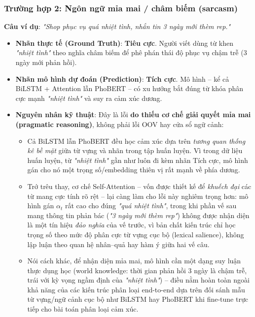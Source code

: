\documentclass[12pt,a4paper]{article}
\begin{document}
\subsubsection{Trường hợp 2: Ngôn ngữ mỉa mai / châm biếm (sarcasm)}\label{sec:error_sarcasm}
\textbf{Câu ví dụ}: \textit{"Shop phục vụ quá nhiệt tình, nhắn tin 3 ngày mới thèm rep."}

\begin{itemize}[leftmargin=1.0cm, itemsep=2pt]
    \item[--] \textbf{Nhãn thực tế (Ground Truth)}: \textbf{Tiêu cực}. Người viết dùng từ khen \textit{"nhiệt tình"} theo nghĩa châm biếm để phê phán thái độ phục vụ chậm trễ (3 ngày mới phản hồi).
    \item[--] \textbf{Nhãn mô hình dự đoán (Prediction)}: \textbf{Tích cực}. Mô hình -- kể cả BiLSTM + Attention lẫn PhoBERT -- có xu hướng bắt đúng từ khóa phân cực mạnh \textit{"nhiệt tình"} và suy ra cảm xúc dương.
    \item[--] \textbf{Nguyên nhân kỹ thuật}: Đây là lỗi \textbf{do thiếu cơ chế giải quyết mỉa mai (pragmatic reasoning)}, không phải lỗi OOV hay cửa sổ ngữ cảnh:
    \begin{itemize}[leftmargin=0.6cm, itemsep=1pt]
        \item Cả BiLSTM lẫn PhoBERT đều học cảm xúc dựa trên \textit{tương quan thống kê bề mặt} giữa từ vựng và nhãn trong tập huấn luyện. Vì trong dữ liệu huấn luyện, từ \textit{"nhiệt tình"} gần như luôn đi kèm nhãn Tích cực, mô hình gán cho nó một trọng số/embedding thiên vị rất mạnh về phía dương.
        \item Trớ trêu thay, cơ chế Self-Attention -- vốn được thiết kế để \textit{khuếch đại} các từ mang cực tính rõ rệt -- lại càng làm cho lỗi này nghiêm trọng hơn: mô hình gán $\alpha_t$ rất cao cho đúng \textit{"quá nhiệt tình"}, trong khi phần vế sau mang thông tin phản bác (\textit{"3 ngày mới thèm rep"}) không được nhận diện là một tín hiệu \textit{đảo nghĩa} của vế trước, vì bản chất kiến trúc chỉ học trọng số theo mức độ phân cực từ vựng cục bộ (lexical salience), không lập luận theo quan hệ nhân--quả hay hàm ý giữa hai vế câu.
        \item Nói cách khác, để nhận diện mỉa mai, mô hình cần một dạng suy luận thực dụng học (world knowledge: thời gian phản hồi 3 ngày là chậm trễ, trái với kỳ vọng ngầm định của \textit{"nhiệt tình"}) -- điều nằm hoàn toàn ngoài khả năng của các kiến trúc phân loại end-to-end dựa trên đối sánh mẫu từ vựng/ngữ cảnh cục bộ như BiLSTM hay PhoBERT khi fine-tune trực tiếp cho bài toán phân loại cảm xúc.
    \end{itemize}
\end{itemize}
\end{document}
